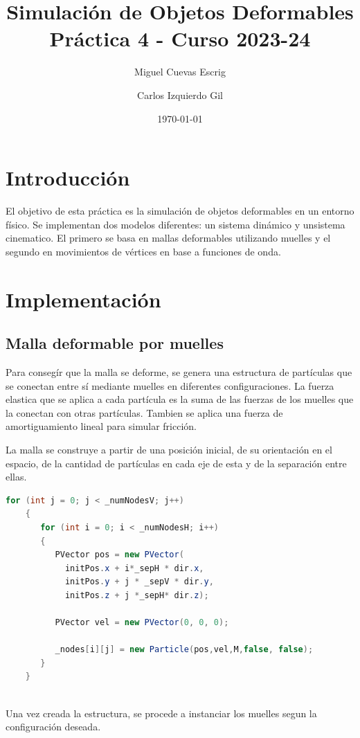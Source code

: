 \documentclass{article}
\title{Simulación de Objetos Deformables \\ \large{Práctica 4 - Curso 2023-24}}
\author{Miguel Cuevas Escrig \and Carlos Izquierdo Gil}
\date{\today}
\begin{document}
\maketitle
\tableofcontents
\section{Introducción}

El objetivo de esta práctica es la simulación de objetos deformables en un entorno físico. Se implementan dos modelos diferentes: un sistema dinámico y unsistema cinematico. El primero se basa en mallas deformables utilizando muelles y el segundo en movimientos de vértices en base a funciones de onda.


\section{Implementación}

\subsection{Malla deformable por muelles}\label{sec:malla-muelle}

Para consegír que la malla se deforme, se genera una estructura de partículas que se conectan entre sí mediante muelles en diferentes configuraciones. La fuerza elastica que se aplica a cada partícula es la suma de las fuerzas de los muelles que la conectan con otras partículas. Tambien se aplica una fuerza de amortiguamiento lineal para simular fricción.

La malla se construye a partir de una posición inicial, de su orientación en el espacio, de la cantidad de partículas en cada eje de esta y de la separación entre ellas.
\begin{lstlisting}[language=Java, frame=single]
    for (int j = 0; j < _numNodesV; j++)
    {
       for (int i = 0; i < _numNodesH; i++)
       {
          PVector pos = new PVector(
            initPos.x + i*_sepH * dir.x, 
            initPos.y + j * _sepV * dir.y, 
            initPos.z + j *_sepH* dir.z);

          PVector vel = new PVector(0, 0, 0);

          _nodes[i][j] = new Particle(pos,vel,M,false, false);
       }
    }
    
\end{lstlisting}

Una vez creada la estructura, se procede a instanciar los muelles segun la configuración deseada.
\end{document}
